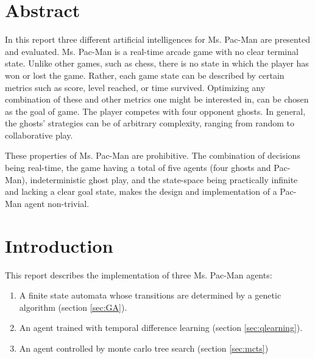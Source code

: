 \section{Abstract}
In this report three different artificial intelligences for Ms. Pac-Man are
presented and evaluated. Ms. Pac-Man is a real-time arcade game with no clear
terminal state. Unlike other games, such as chess, there is no state in which
the player has won or lost the game. Rather, each game state can be described by certain metrics such as score, level reached, or time survived. Optimizing any
combination of these and other metrics one might be interested in, can be
chosen as the goal of game. The player competes with four opponent ghosts. In
general, the ghosts' strategies can be of arbitrary complexity, ranging from
random to collaborative play.

These properties of Ms. Pac-Man are prohibitive. The combination of decisions
being real-time, the game having a total of five agents (four ghosts and
Pac-Man), indeterministic ghost play, and the state-space being practically
infinite and lacking a clear goal state, makes the design and implementation of
a Pac-Man agent non-trivial.

\section{Introduction}
This report describes the implementation of three Ms. Pac-Man agents:
\begin{enumerate}
	\item A finite state automata whose transitions are determined by a genetic
		algorithm (section \ref{sec:GA}).
	\item An agent trained with temporal difference learning (section
		\ref{sec:qlearning}).
	\item An agent controlled by monte carlo tree search (section \ref{sec:mcts})
\end{enumerate}
